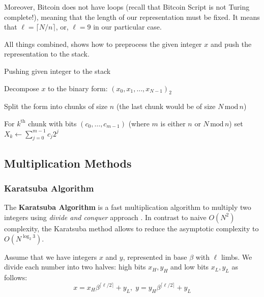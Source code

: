 \documentclass{iacrtrans}
\begin{document}
Moreover, Bitcoin does not have loops (recall that Bitcoin Script is not Turing complete!), meaning that the length of our representation must be fixed. It means that $\ell = \lceil N/n \rceil$, or, $\ell=9$ in our particular case. 

All things combined,  shows how to preprocess the given integer $x$ and push the representation to the stack.

\begin{algorithm}
\caption{Pushing given integer to the stack}\label{alg:integer_representation}

Decompose $x$ to the binary form: $(x_0,x_1,\dots,x_{N-1})_2$

Split the form into chunks of size $n$ (the last chunk would be of size $N \, \text{mod} \, n$)

For $k^{\text{th}}$ chunk with bits $(c_0,\dots,c_{m-1})$ (where $m$ is either $n$ or $N \, \text{mod} \, n$) set $X_k \gets \sum_{j=0}^{m-1} c_j2^j$


\end{algorithm}

\subsection{Multiplication Methods}\label{section:multiplication_methods}


\subsubsection{Karatsuba Algorithm}\label{section:karatsuba}

The \textbf{Karatsuba Algorithm} is a fast multiplication algorithm to multiply two integers using \textit{divide and conquer} approach \cite{karatsuba}. In contrast to naive $O(N^2)$ complexity, the Karatsuba method allows to reduce the asymptotic complexity to $O(N^{\log_2 3})$. 

Assume that we have integers $x$ and $y$, represented in base $\beta$ with $\ell$ limbs. We divide each number into two halves: high bits $x_H,y_H$ and low bits $x_L,y_L$ as follows:
\begin{equation}
    x = x_H\beta^{\lceil\ell/2\rceil} + y_L, \; y = y_H\beta^{\lceil\ell/2\rceil} + y_L
\end{equation}
\end{document}
